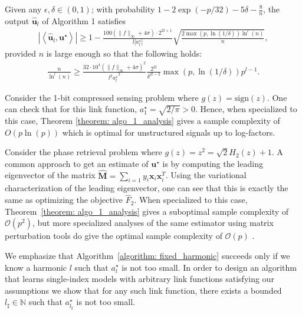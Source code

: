 \documentclass[final,12pt]{colt2018} %
\newcommand{\N}{\mathbb{N}}
\renewcommand\v[1]{{\ensuremath{\boldsymbol{#1}}}}
\newcommand\ip[1]{\left\langle #1 \right\rangle}
\begin{document}
\begin{theorem} Given any $\epsilon,\delta \in (0,1)$; with probability $1 - 2\exp(-p/32)-5\delta - \frac{8}{n}$, the output $ \hat{\v u}_l$ of Algorithm 1 satisfies
\begin{align*}
    |\ip{\hat{\v u}_l, \v u^\star}| \geq 1 - \frac{100 (\|f\|_\infty + 4\sigma) \cdot 2^{2l+1}}{l|a_l^\star|} \sqrt{\frac{2\max(p,\ln(1/\delta))\ln^l(n)}{n}},
\end{align*}
provided $n$ is large enough so that the following holds:
\begin{align*}
    \frac{n}{\ln^l(n)} \geq \frac{32\cdot 10^4 (\|f\|_\infty + 4\sigma)^2}{{l^2 a_l^\star}^2} \frac{2^{2l}}{\delta^{2l-2}}\max(p,\ln(1/\delta)) p^{l-1}.
\end{align*}
\label{theorem: algo_1_analysis}
\end{theorem}
\begin{remark} Consider the 1-bit compressed sensing problem where $g(z) = \text{sign}(z)$. One can check that for this link function, $a_1^\star = \sqrt{2/\pi}>0$. Hence, when specialized to this case, Theorem \ref{theorem: algo_1_analysis} gives a sample complexity of $O(p\ln(p))$ which is optimal for unstructured signals up to log-factors.
\end{remark}
\begin{remark} Consider the phase retrieval problem where $g(z) = z^2 = \sqrt{2}H_2(z) + 1$. A common approach to get an estimate of $\v u^\star$ is by computing the leading eigenvector of the matrix $\widehat{\v M} = \sum_{i=1} y_i \v x_i \v x_i^T$.
Using the variational characterization of the leading eigenvector, one can see that this is exactly the same as optimizing the objective  $\hat{F}_2$. When specialized to this case, Theorem~\ref{theorem: algo_1_analysis} gives a suboptimal sample complexity of $\mathcal{O}(p^2)$, but more specialized analyses of the same estimator using matrix perturbation tools do give the optimal sample complexity of $\mathcal{O}(p)$ \citep[see, e.g.,][]{candes2015phase}.
\end{remark}

We emphasize that Algorithm~\ref{algorithm: fixed_harmonic} succeeds only if we know a harmonic $l$ such that $a^\star_l$ is not too small. In order to design an algorithm that learns single-index models with arbitrary link functions satisfying our assumptions we show that for any such link function, there exists a bounded $l_\sharp \in \N$ such that $a_{l_\sharp}^\star$ is not too small. 
\end{document}
